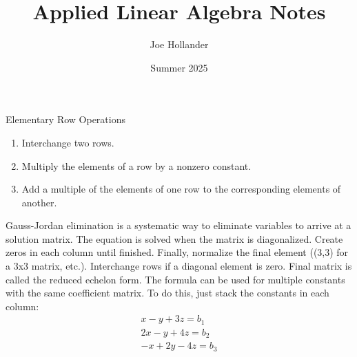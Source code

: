 \documentclass{article}
\title{Applied Linear Algebra Notes}
\author{Joe Hollander}
\date{Summer 2025}
\begin{document}
\maketitle 

\section{}
\subsection{}
Elementary Row Operations
\begin{enumerate}
    \item Interchange two rows.
    \item Multiply the elements of a row by a nonzero constant.
    \item Add a multiple of the elements of one row to the corresponding elements of another.
\end{enumerate}
Gauss-Jordan elimination is a systematic way to eliminate variables to arrive at a solution matrix. 
The equation is solved when the matrix is diagonalized. Create zeros in each column until finished. 
Finally, normalize the final element ((3,3) for a 3x3 matrix, etc.). 
Interchange rows if a diagonal element is zero. Final matrix is called the reduced echelon form.
The formula can be used for multiple constants with the same coefficient matrix. 
To do this, just stack the constants in each column: 
\begin{gather}
x - y + 3z = b_1 \\
2x - y + 4z = b_2 \\
-x + 2y -4z = b_3
\end{gather}
\end{document}
